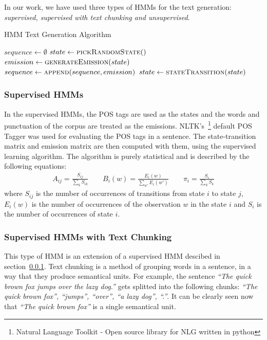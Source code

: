 \documentclass[a4paper,12pt]{article}
\begin{document}
In our work, we have used three types of HMMs for the text generation:
\textit{supervised, supervised with text chunking and unsupervised}.

\begin{algorithm}
\caption{HMM Text Generation Algorithm}
\label{alg:hmm}
\begin{algorithmic}[1]
	\State $sequence \gets \emptyset$
	\State $state \gets \Call{pickRandomState}$
	\Repeat
		\State $emission \gets \Call{generateEmission}{state}$
		\State $sequence \gets \Call{append}{sequence, emission}$
		\State $state \gets \Call{stateTransition}{state}$
	 \\
\end{algorithmic}
\end{algorithm}

\subsubsection{Supervised HMMs}
\label{sec:suphmm}
In the supervised HMMs, the POS tags are used as the states and the words and
punctuation of the corpus are treated as the emissions. NLTK's~\footnote{Natural
Language Toolkit - Open source library for NLG written in python} default POS Tagger was
used for evaluating the POS tags in a sentence. The state-transition matrix and
emission matrix are then computed with them, using the supervised learning
algorithm. The algorithm is purely statistical and is described by the
following equations:
\begin{align*}
A_{ij} = \frac{S_{ij}}{\sum_{k} S_{ik}} \qquad
B_{i}(w) = \frac{E_{i}(w)}{\sum_{w'} E_{i}(w')} \qquad
\pi_{i} = \frac{S_{i}}{\sum_{k} S_{k}}
\end{align*}
where $S_{ij}$ is the number of occurrences of transitions from state $i$ to
state $j$, $E_{i}(w)$ is the number of occurrences of the observation $w$ in the
state $i$ and $S_{i}$ is the number of occurrences of state $i$.

\subsubsection{Supervised HMMs with Text Chunking}
This type of HMM is an extension of a supervised HMM descibed in
section~\ref{sec:suphmm}. Text chunking is a method of grouping words in a
sentence, in a way that they produce semantical units. For example, the sentence
\textit{``The quick brown fox jumps over the lazy dog.''} gets splitted into the
following chunks: \textit{``The quick brown fox'', ``jumps'', ``over'', ``a lazy
dog'', ``.''}. It can be clearly seen now that \textit{``The quick brown fox''}
is a single semantical unit.
\end{document}
